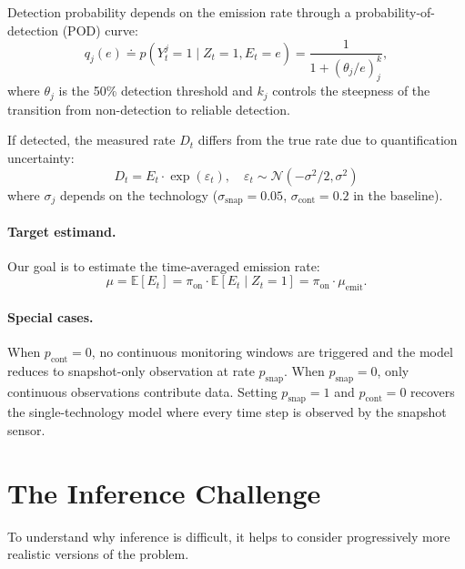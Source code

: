 \documentclass[11pt]{article}
\newcommand{\E}{\mathbb{E}}
\begin{document}
Detection probability depends on the emission rate through a probability-of-detection (POD) curve:
\begin{equation}
    q_j(e)
    \doteq p(Y^j_t=1\mid Z_t=1,E_t=e)
    = \frac{1}{1+(\theta_j/e)^k_j},
\end{equation}
where $\theta_j$ is the 50\% detection threshold and $k_j$ controls the steepness of the transition from non-detection to reliable detection.

If detected, the measured rate $D_t$ differs from the true rate due to quantification uncertainty:
\begin{equation}
    D_t = E_t \cdot \exp(\varepsilon_t), \quad \varepsilon_t \sim \mathcal{N}(-\sigma^2/2, \sigma^2)
\end{equation}
where $\sigma_j$ depends on the technology ($\sigma_{\text{snap}} = 0.05$, $\sigma_{\text{cont}} = 0.2$ in the baseline).

\paragraph{Target estimand.} Our goal is to estimate the time-averaged emission rate:
\begin{equation}
    \mu = \E[E_t] = \pi_{\text{on}} \cdot \E[E_t \mid Z_t = 1] = \pi_{\text{on}} \cdot \mu_{\text{emit}}.
\end{equation}

\paragraph{Special cases.}
When $p_{\text{cont}} = 0$, no continuous monitoring windows are triggered and the model reduces to snapshot-only observation at rate $p_{\text{snap}}$. When $p_{\text{snap}} = 0$, only continuous observations contribute data. Setting $p_{\text{snap}} = 1$ and $p_{\text{cont}} = 0$ recovers the single-technology model where every time step is observed by the snapshot sensor.

\section{The Inference Challenge}
\label{sec:challenge}

To understand why inference is difficult, it helps to consider progressively more realistic versions of the problem.
\end{document}
